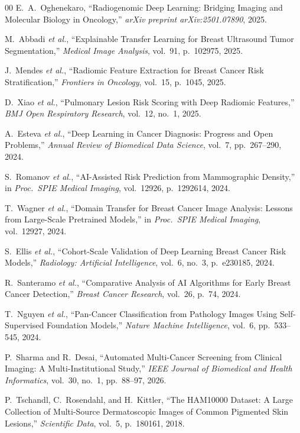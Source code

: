 \documentclass[conference]{IEEEtran}
\begin{document}
\begin{thebibliography}{00}
E.~A.~Oghenekaro, ``Radiogenomic Deep Learning: Bridging Imaging and Molecular Biology in Oncology,'' \textit{arXiv preprint arXiv:2501.07890}, 2025.

M.~Abbadi \textit{et al.}, ``Explainable Transfer Learning for Breast Ultrasound Tumor Segmentation,'' \textit{Medical Image Analysis}, vol.~91, p.~102975, 2025.

J.~Mendes \textit{et al.}, ``Radiomic Feature Extraction for Breast Cancer Risk Stratification,'' \textit{Frontiers in Oncology}, vol.~15, p.~1045, 2025.

D.~Xiao \textit{et al.}, ``Pulmonary Lesion Risk Scoring with Deep Radiomic Features,'' \textit{BMJ Open Respiratory Research}, vol.~12, no.~1, 2025.

A.~Esteva \textit{et al.}, ``Deep Learning in Cancer Diagnosis: Progress and Open Problems,'' \textit{Annual Review of Biomedical Data Science}, vol.~7, pp.~267--290, 2024.

S.~Romanov \textit{et al.}, ``AI-Assisted Risk Prediction from Mammographic Density,'' in \textit{Proc.~SPIE Medical Imaging}, vol.~12926, p.~1292614, 2024.

T.~Wagner \textit{et al.}, ``Domain Transfer for Breast Cancer Image Analysis: Lessons from Large-Scale Pretrained Models,'' in \textit{Proc.~SPIE Medical Imaging}, vol.~12927, 2024.

S.~Ellis \textit{et al.}, ``Cohort-Scale Validation of Deep Learning Breast Cancer Risk Models,'' \textit{Radiology: Artificial Intelligence}, vol.~6, no.~3, p.~e230185, 2024.

R.~Santeramo \textit{et al.}, ``Comparative Analysis of AI Algorithms for Early Breast Cancer Detection,'' \textit{Breast Cancer Research}, vol.~26, p.~74, 2024.

T.~Nguyen \textit{et al.}, ``Pan-Cancer Classification from Pathology Images Using Self-Supervised Foundation Models,'' \textit{Nature Machine Intelligence}, vol.~6, pp.~533--545, 2024.

P.~Sharma and R.~Desai, ``Automated Multi-Cancer Screening from Clinical Imaging: A Multi-Institutional Study,'' \textit{IEEE Journal of Biomedical and Health Informatics}, vol.~30, no.~1, pp.~88--97, 2026.

P.~Tschandl, C.~Rosendahl, and H.~Kittler, ``The HAM10000 Dataset: A Large Collection of Multi-Source Dermatoscopic Images of Common Pigmented Skin Lesions,'' \textit{Scientific Data}, vol.~5, p.~180161, 2018.


\end{thebibliography}
\end{document}
